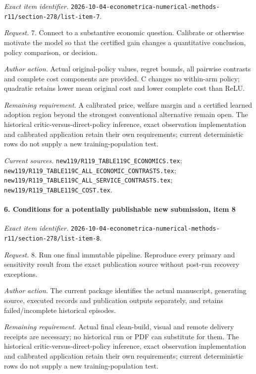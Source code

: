 \emph{Exact item identifier.} \nolinkurl{2026-10-04-econometrica-numerical-methods-r11/section-278/list-item-7}.

\par\emph{Request.} 7. Connect to a substantive economic question. Calibrate or otherwise motivate the model so that the certified gain changes a quantitative conclusion, policy comparison, or decision.

\par\emph{Author action.} Actual original-policy values, regret bounds, all pairwise contrasts and complete cost components are provided. C changes no within-arm policy; quadratic retains lower mean original cost and lower complete cost than ReLU.

\par\emph{Remaining requirement.} A calibrated price, welfare margin and a certified learned adoption region beyond the strongest conventional alternative remain open. The historical critic-versus-direct-policy inference, exact observation implementation and calibrated application retain their own requirements; current deterministic rows do not supply a new training-population test.

\par\emph{Current sources.} \nolinkurl{new119/R119_TABLE119C_ECONOMICS.tex}; \nolinkurl{new119/R119_TABLE119C_ALL_ECONOMIC_CONTRASTS.tex}; \nolinkurl{new119/R119_TABLE119C_ALL_SERVICE_CONTRASTS.tex}; \nolinkurl{new119/R119_TABLE119C_COST.tex}.

\paragraph{6. Conditions for a potentially publishable new submission, item 8}

\emph{Exact item identifier.} \nolinkurl{2026-10-04-econometrica-numerical-methods-r11/section-278/list-item-8}.

\par\emph{Request.} 8. Run one final immutable pipeline. Reproduce every primary and sensitivity result from the exact publication source without post-run recovery exceptions.

\par\emph{Author action.} The current package identifies the actual manuscript, generating source, executed records and publication outputs separately, and retains failed/\allowbreak{}incomplete historical episodes.

\par\emph{Remaining requirement.} Actual final clean-build, visual and remote delivery receipts are necessary; no historical run or PDF can substitute for them. The historical critic-versus-direct-policy inference, exact observation implementation and calibrated application retain their own requirements; current deterministic rows do not supply a new training-population test.

